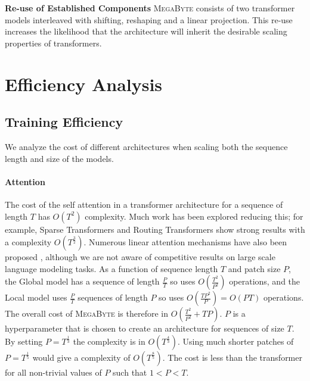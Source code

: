 \textbf{Re-use of Established Components} \textsc{MegaByte} consists of two transformer models interleaved with shifting, reshaping and a linear projection. This re-use increases the likelihood that the architecture will inherit the desirable scaling properties of transformers.

\section{Efficiency Analysis}
\subsection{Training Efficiency} We analyze the cost of different architectures when scaling both the sequence length and size of the models.

\paragraph{Attention} The cost of the self attention in a transformer architecture for a sequence of length $T$ has $O(T^2)$ complexity. Much work has been explored reducing this; for example, Sparse Transformers \citep{sparsetransformer} and Routing Transformers \citep{routing} show strong results with a complexity $O(T^\frac{3}{2})$. Numerous linear attention mechanisms have also been proposed \citep{lineartransformer,linear, performer}, although we are not aware of competitive results on large scale language modeling tasks. As a function of sequence length $T$ and patch size $P$, the Global model has a sequence of length $\frac{P}{T}$ so uses $O(\frac{T^2}{P^2})$ operations, and the Local model uses $\frac{P}{T}$ sequences of length $P$ so uses $O(\frac{TP^2}{P})=O(PT)$ operations. The overall cost of \textsc{MegaByte} is therefore in $O(\frac{T^2}{P^2}+TP)$. $P$ is a hyperparameter that is chosen to create an architecture for sequences of size $T$. By setting $P=T^\frac{1}{3}$ the complexity is in $O(T^\frac{4}{3})$. Using much shorter patches of $P=T^\frac{1}{5}$ would give a complexity of $O(T^\frac{8}{5})$. The cost is less than the transformer for all non-trivial values of $P$ such that $1<P<T$. 

